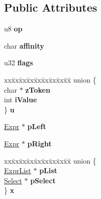 \subsection*{Public Attributes}
\begin{DoxyCompactItemize}
\item 
u8 {\bfseries op}\hypertarget{structExpr_a101c55ddb6c149d95f0327831eb78225}{}\label{structExpr_a101c55ddb6c149d95f0327831eb78225}

\item 
char {\bfseries affinity}\hypertarget{structExpr_aeb51b76e606d6fbae234e38473bf3dc9}{}\label{structExpr_aeb51b76e606d6fbae234e38473bf3dc9}

\item 
u32 {\bfseries flags}\hypertarget{structExpr_aebac9ee7e6aa7adca63969d3ba8d0ded}{}\label{structExpr_aebac9ee7e6aa7adca63969d3ba8d0ded}

\item 
\begin{tabbing}
xx\=xx\=xx\=xx\=xx\=xx\=xx\=xx\=xx\=\kill
union \{\\
\>char $\ast$ {\bfseries zToken}\\
\>int {\bfseries iValue}\\
\} {\bfseries u}\hypertarget{structExpr_a5a43a51aa0ee7afc9babcdc337dd77db}{}\label{structExpr_a5a43a51aa0ee7afc9babcdc337dd77db}
\\

\end{tabbing}\item 
\hyperlink{structExpr}{Expr} $\ast$ {\bfseries p\+Left}\hypertarget{structExpr_a0a78282ae0d696f4a25013a12e38b1ba}{}\label{structExpr_a0a78282ae0d696f4a25013a12e38b1ba}

\item 
\hyperlink{structExpr}{Expr} $\ast$ {\bfseries p\+Right}\hypertarget{structExpr_aa08c218d5b0b6f8882e8bf9ec8822a08}{}\label{structExpr_aa08c218d5b0b6f8882e8bf9ec8822a08}

\item 
\begin{tabbing}
xx\=xx\=xx\=xx\=xx\=xx\=xx\=xx\=xx\=\kill
union \{\\
\>\hyperlink{structExprList}{ExprList} $\ast$ {\bfseries pList}\\
\>\hyperlink{structSelect}{Select} $\ast$ {\bfseries pSelect}\\
\} {\bfseries x}\hypertarget{structExpr_a9ff6313055718299e20a19e551dcbf0a}{}\label{structExpr_a9ff6313055718299e20a19e551dcbf0a}
\\


\end{tabbing}
\end{DoxyCompactItemize}
